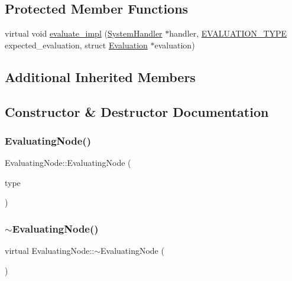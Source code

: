 \subsection*{Protected Member Functions}
\begin{DoxyCompactItemize}
\item 
virtual void \hyperlink{classEvaluatingNode_abb86fa7334a5871f959b0633db3b5215}{evaluate\+\_\+impl} (\hyperlink{classSystemHandler}{System\+Handler} $\ast$handler, \hyperlink{statics_8h_a6664c451ca7787483a7981cc1de68dbb}{E\+V\+A\+L\+U\+A\+T\+I\+O\+N\+\_\+\+T\+Y\+PE} expected\+\_\+evaluation, struct \hyperlink{structEvaluation}{Evaluation} $\ast$evaluation)
\end{DoxyCompactItemize}
\subsection*{Additional Inherited Members}


\subsection{Constructor \& Destructor Documentation}
\mbox{\label{classEvaluatingNode_a0ece59961a22a6f07d53e75f41707683}} 
\subsubsection{\texorpdfstring{Evaluating\+Node()}{EvaluatingNode()}}
{\footnotesize\ttfamily Evaluating\+Node\+::\+Evaluating\+Node (\begin{DoxyParamCaption}\item[{\hyperlink{statics_8h_a1ec6d4bfce2e004debbc141eafc512db}{N\+O\+D\+E\+\_\+\+T\+Y\+PE}}]{type }\end{DoxyParamCaption})}

\mbox{\label{classEvaluatingNode_aac142cb781f91833f01c537f3b76b1d2}} 
\subsubsection{\texorpdfstring{$\sim$\+Evaluating\+Node()}{~EvaluatingNode()}}
{\footnotesize\ttfamily virtual Evaluating\+Node\+::$\sim$\+Evaluating\+Node (\begin{DoxyParamCaption}{ }\end{DoxyParamCaption})\hspace{0.3cm}{\ttfamily [virtual]}}



